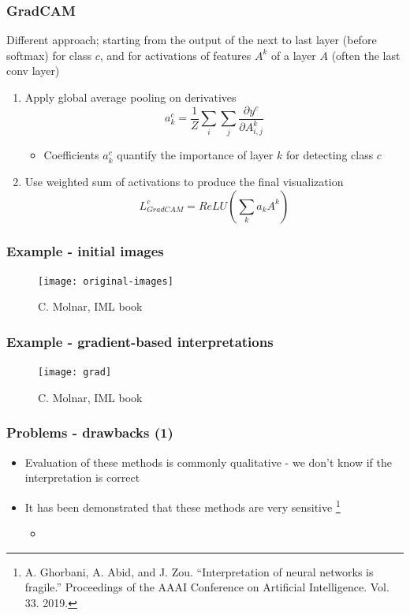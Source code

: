 \begin{frame}
  \frametitle{GradCAM}
  Different approach; starting from the output of the next to last layer
  (before softmax) for class $c$, and for activations of features $A^{k}$ of a layer $A$
  (often the last conv layer)
  \begin{enumerate}
  \item Apply global average pooling on derivatives
    \begin{equation*}
      a_{k}^{c} = \frac{1}{Z}\sum\limits_i\sum\limits_j\frac{\partial
        y^{c}}{\partial A^{k}_{i, j}}
    \end{equation*}
    \begin{itemize}
    \item Coefficients $a_{k}^{c}$ quantify the importance of layer $k$ for
      detecting class $c$
    \end{itemize}
  \item Use weighted sum of activations to produce the final visualization
    \begin{equation*}
      L_{GradCAM}^{c} = ReLU\left(\sum\limits_ka_kA^{k}\right)
    \end{equation*}
  \end{enumerate}
\end{frame}

\begin{frame}
  \frametitle{Example - initial images}
  \begin{figure}
    \texttt{[image: original-images]}
    \caption{\footnotesize C. Molnar, IML book}
  \end{figure}

\end{frame}

\begin{frame}
  \frametitle{Example - gradient-based interpretations}
  \begin{figure}
    \texttt{[image: grad]}
    \caption{\footnotesize C. Molnar, IML book}
  \end{figure}
\end{frame}

\begin{frame}
  \frametitle{Problems - drawbacks (1)}
  \begin{itemize}
  \item Evaluation of these methods is commonly qualitative - we don't know if
    the interpretation is correct
  \item It has been demonstrated that these methods are very sensitive
    \footnote{A. Ghorbani, A. Abid, and J. Zou. ``Interpretation of
    neural networks is fragile.'' Proceedings of the AAAI Conference on
    Artificial Intelligence. Vol. 33. 2019.}
    \begin{itemize}
    \item {}
    \end{itemize}
  \end{itemize}
\end{frame}


